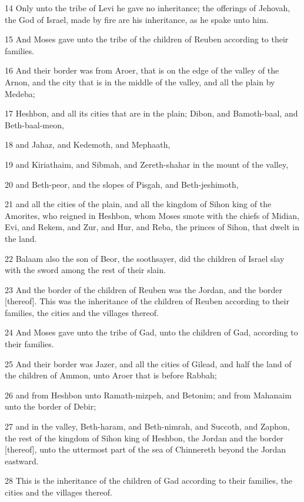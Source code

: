 \par 14 Only unto the tribe of Levi he gave no inheritance; the offerings of Jehovah, the God of Israel, made by fire are his inheritance, as he spake unto him.
\par 15 And Moses gave unto the tribe of the children of Reuben according to their families.
\par 16 And their border was from Aroer, that is on the edge of the valley of the Arnon, and the city that is in the middle of the valley, and all the plain by Medeba;
\par 17 Heshbon, and all its cities that are in the plain; Dibon, and Bamoth-baal, and Beth-baal-meon,
\par 18 and Jahaz, and Kedemoth, and Mephaath,
\par 19 and Kiriathaim, and Sibmah, and Zereth-shahar in the mount of the valley,
\par 20 and Beth-peor, and the slopes of Pisgah, and Beth-jeshimoth,
\par 21 and all the cities of the plain, and all the kingdom of Sihon king of the Amorites, who reigned in Heshbon, whom Moses smote with the chiefs of Midian, Evi, and Rekem, and Zur, and Hur, and Reba, the princes of Sihon, that dwelt in the land.
\par 22 Balaam also the son of Beor, the soothsayer, did the children of Israel slay with the sword among the rest of their slain.
\par 23 And the border of the children of Reuben was the Jordan, and the border [thereof]. This was the inheritance of the children of Reuben according to their families, the cities and the villages thereof.
\par 24 And Moses gave unto the tribe of Gad, unto the children of Gad, according to their families.
\par 25 And their border was Jazer, and all the cities of Gilead, and half the land of the children of Ammon, unto Aroer that is before Rabbah;
\par 26 and from Heshbon unto Ramath-mizpeh, and Betonim; and from Mahanaim unto the border of Debir;
\par 27 and in the valley, Beth-haram, and Beth-nimrah, and Succoth, and Zaphon, the rest of the kingdom of Sihon king of Heshbon, the Jordan and the border [thereof], unto the uttermost part of the sea of Chinnereth beyond the Jordan eastward.
\par 28 This is the inheritance of the children of Gad according to their families, the cities and the villages thereof.
